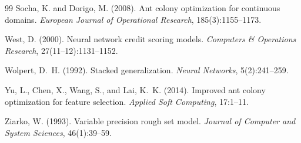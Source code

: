 \documentclass[12pt,a4paper]{article}
\begin{document}
\begin{thebibliography}{99}
Socha, K. and Dorigo, M. (2008).
\newblock Ant colony optimization for continuous domains.
\newblock \textit{European Journal of Operational Research}, 185(3):1155--1173.

West, D. (2000).
\newblock Neural network credit scoring models.
\newblock \textit{Computers \& Operations Research}, 27(11--12):1131--1152.

Wolpert, D.~H. (1992).
\newblock Stacked generalization.
\newblock \textit{Neural Networks}, 5(2):241--259.

Yu, L., Chen, X., Wang, S., and Lai, K.~K. (2014).
\newblock Improved ant colony optimization for feature selection.
\newblock \textit{Applied Soft Computing}, 17:1--11.

Ziarko, W. (1993).
\newblock Variable precision rough set model.
\newblock \textit{Journal of Computer and System Sciences}, 46(1):39--59.

\end{thebibliography}
\end{document}
